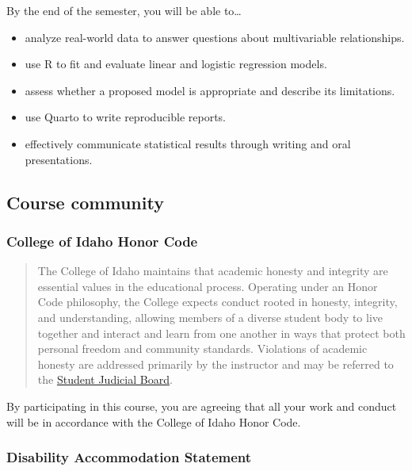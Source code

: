 \documentclass[
  letterpaper,
  DIV=11,
  numbers=noendperiod]{scrartcl}
\providecommand{\tightlist}{%
  \setlength{\itemsep}{0pt}\setlength{\parskip}{0pt}}
\begin{document}
By the end of the semester, you will be able to\ldots{}

\begin{itemize}
\tightlist
\item
  analyze real-world data to answer questions about multivariable
  relationships.
\item
  use R to fit and evaluate linear and logistic regression models.
\item
  assess whether a proposed model is appropriate and describe its
  limitations.
\item
  use Quarto to write reproducible reports.
\item
  effectively communicate statistical results through writing and oral
  presentations.
\end{itemize}

\subsection{Course community}\label{course-community}

\subsubsection{College of Idaho Honor
Code}\label{college-of-idaho-honor-code}

\begin{quote}
The College of Idaho maintains that academic honesty and integrity are
essential values in the educational process. Operating under an Honor
Code philosophy, the College expects conduct rooted in honesty,
integrity, and understanding, allowing members of a diverse student body
to live together and interact and learn from one another in ways that
protect both personal freedom and community standards. Violations of
academic honesty are addressed primarily by the instructor and may be
referred to the
\href{https://collegeofidaho.smartcatalogiq.com/en/current/Undergraduate-Catalog/Policies-and-Procedures/Academic-Misconduct}{Student
Judicial Board}.
\end{quote}

By participating in this course, you are agreeing that all your work and
conduct will be in accordance with the College of Idaho Honor Code.

\subsubsection{Disability Accommodation
Statement}\label{disability-accommodation-statement}
\end{document}

